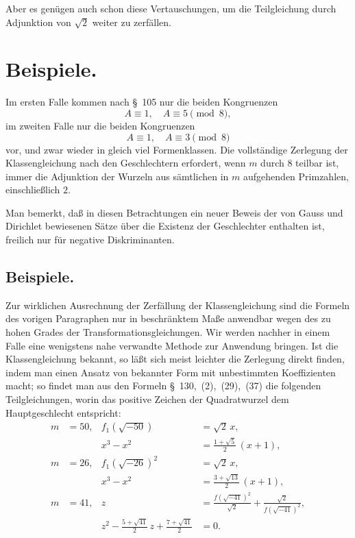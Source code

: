 \documentclass[12pt,a4paper]{article}
\theoremstyle{definition}
\begin{document}
Aber es genügen auch schon diese Vertauschungen, um die Teilgleichung durch 
Adjunktion von $\sqrt{2}$ weiter zu zerfällen.

\section{Beispiele.}

Im ersten Falle kommen nach \S~105 nur die beiden Kongruenzen
\[
A \equiv 1,\quad A \equiv 5 \pmod 8,
\]
im zweiten Falle nur die beiden Kongruenzen
\[
A \equiv 1,\quad A \equiv 3 \pmod 8
\]
vor, und zwar wieder in gleich viel Formenklassen. Die vollständige 
Zerlegung der Klassengleichung nach den Geschlechtern erfordert, wenn $m$ 
durch $8$ teilbar ist, immer die Adjunktion der Wurzeln aus sämtlichen in 
$m$ aufgehenden Primzahlen, einschließlich $2$.

Man bemerkt, daß in diesen Betrachtungen ein neuer Beweis der von Gauss und 
Dirichlet bewiesenen Sätze über die Existenz der Geschlechter enthalten ist, 
freilich nur für negative Diskriminanten.

\subsection*{Beispiele.}

Zur wirklichen Ausrechnung der Zerfällung der Klassengleichung sind die 
Formeln des vorigen Paragraphen nur in beschränktem Maße anwendbar wegen des 
zu hohen Grades der Transformationsgleichungen. Wir werden nachher in einem 
Falle eine wenigstens nahe verwandte Methode zur Anwendung bringen. Ist die 
Klassengleichung bekannt, so läßt sich meist leichter die Zerlegung direkt 
finden, indem man einen Ansatz von bekannter Form mit unbestimmten 
Koeffizienten macht; so findet man aus den Formeln \S~130,~(2),~(29),~(37) 
die folgenden Teilgleichungen, worin das positive Zeichen der Quadratwurzel 
dem Hauptgeschlecht entspricht:
\begin{align*}
m &= 50, & f_{1}(\sqrt{-50}) &= \sqrt{2}\,x,\\
& & x^{3} - x^{2} &= \frac{1+\sqrt{5}}{2}\,(x+1),\\[6pt]
m &= 26, & f_{1}(\sqrt{-26})^{2} &= \sqrt{2}\,x,\\
& & x^{3} - x^{2} &= \frac{3+\sqrt{13}}{2}\,(x+1),\\[6pt]
m &= 41, & z &= \frac{f(\sqrt{-41})^{2}}{\sqrt{2}} + \frac{\sqrt{2}}{f(\sqrt{-41})^{2}},\\
& & z^{2} - \frac{5+\sqrt{41}}{2}\,z + \frac{7+\sqrt{41}}{2} &= 0.
\end{align*}
\end{document}
